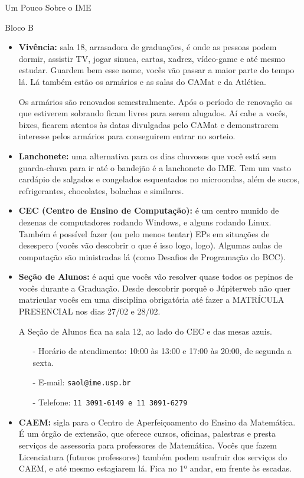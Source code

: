 \begin{secao}{Um Pouco Sobre o IME}
\begin{subsecao}{Bloco B}
\begin{itemize}
\item {\bf Vivência:} sala 18, arrasadora de graduações, é onde as pessoas podem
dormir, assistir TV, jogar sinuca, cartas, xadrez, vídeo-game e até
mesmo estudar. Guardem bem esse nome, vocês vão passar a maior parte do tempo lá.
Lá também estão os armários e as salas do CAMat e da Atlética.

Os armários são renovados semestralmente. Após o período de renovação os que
estiverem sobrando ficam livres para serem alugados. Aí cabe a vocês, bixes, ficarem
atentos às datas divulgadas pelo CAMat e demonstrarem interesse pelos armários para
conseguirem entrar no sorteio.

\item {\bf Lanchonete:} uma alternativa para os dias chuvosos que você está sem
  guarda-chuva para ir até o bandejão é a lanchonete do IME. Tem um vasto
  cardápio de salgados e congelados esquentados no microondas, além de sucos,
  refrigerantes, chocolates, bolachas e similares.

\item {\bf CEC (Centro de Ensino de Computação):} é um centro munido de dezenas
de computadores rodando Windows, e alguns rodando Linux. Também é possível fazer
(ou pelo menos tentar) EPs em situações de desespero (vocês vão descobrir o que é
isso logo, logo). Algumas aulas de computação são ministradas lá (como Desafios
de Programação do BCC).

\item {\bf Seção de Alunos:} é aqui que vocês vão resolver quase todos os
pepinos de vocês durante a Graduação. Desde descobrir porquê o Júpiterweb não
quer matricular vocês em uma disciplina obrigatória até fazer a
MATRÍCULA PRESENCIAL nos dias 27/02 e 28/02. %

A Seção de Alunos fica na sala 12, ao lado do CEC e das mesas azuis.
\begin{itemize}
\item[-] Horário de atendimento: 10:00 às 13:00 e 17:00 às 20:00, de segunda a sexta.
\item[-] E-mail: \tt{saol@ime.usp.br}
\item[-] Telefone: \tt{11 3091-6149} e \tt{11 3091-6279}
\end{itemize}

\item {\bf CAEM:} sigla para o Centro de Aperfeiçoamento do Ensino da
  Matemática. É um órgão de extensão, que oferece cursos, oficinas, palestras e
  presta serviços de assessoria para professores de Matemática. Vocês que fazem
  Licenciatura (futuros professores) também podem usufruir dos serviços do CAEM,
  e até mesmo estagiarem lá. Fica no 1º andar, em frente às escadas.


\end{itemize}
\end{subsecao}
\end{secao}
